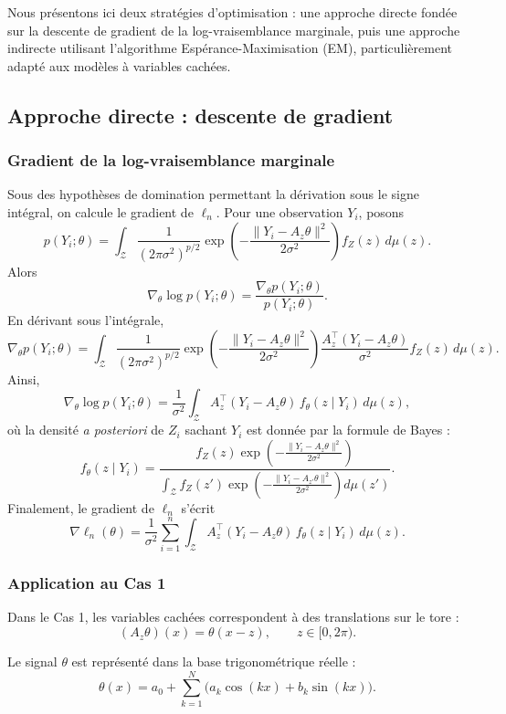 \documentclass[12pt, a4paper]{article}
\theoremstyle{definition}
\begin{document}
Nous présentons ici deux stratégies d’optimisation : une approche directe fondée sur la descente de gradient de la log-vraisemblance marginale, puis une approche indirecte utilisant l’algorithme Espérance-Maximisation (EM), particulièrement adapté aux modèles à variables cachées.

\subsection{Approche directe : descente de gradient}
\label{subsec:gradient}

\subsubsection{Gradient de la log-vraisemblance marginale}

Sous des hypothèses de domination permettant la dérivation sous le signe intégral, on calcule le gradient de $\ell_n$. Pour une observation $Y_i$, posons
\[
p(Y_i;\theta) = \int_{\mathcal{Z}} \frac{1}{(2\pi\sigma^2)^{p/2}} \exp\!\left( -\frac{\|Y_i-A_z\theta\|^2}{2\sigma^2} \right) f_Z(z)\,d\mu(z).
\]
Alors
\[
\nabla_\theta \log p(Y_i;\theta) = \frac{\nabla_\theta p(Y_i;\theta)}{p(Y_i;\theta)}.
\]
En dérivant sous l’intégrale,
\[
\nabla_\theta p(Y_i;\theta) = \int_{\mathcal{Z}} \frac{1}{(2\pi\sigma^2)^{p/2}} \exp\!\left( -\frac{\|Y_i-A_z\theta\|^2}{2\sigma^2} \right) \frac{A_z^\top (Y_i-A_z\theta)}{\sigma^2} f_Z(z)\,d\mu(z).
\]
Ainsi,
\[
\nabla_\theta \log p(Y_i;\theta) = \frac{1}{\sigma^2} \int_{\mathcal{Z}} A_z^\top (Y_i-A_z\theta) \, f_\theta(z\mid Y_i)\,d\mu(z),
\]
où la densité \textit{a posteriori} de $Z_i$ sachant $Y_i$ est donnée par la formule de Bayes :
\[
f_\theta(z\mid Y_i) = \frac{ f_Z(z) \exp\!\left( -\frac{\|Y_i-A_z\theta\|^2}{2\sigma^2} \right) }{ \int_{\mathcal{Z}} f_Z(z') \exp\!\left( -\frac{\|Y_i-A_{z'}\theta\|^2}{2\sigma^2} \right) d\mu(z') }.
\]
Finalement, le gradient de $\ell_n$ s’écrit
\[
\boxed{ \nabla \ell_n(\theta) = \frac{1}{\sigma^2} \sum_{i=1}^n \int_{\mathcal{Z}} A_z^\top (Y_i-A_z\theta) \, f_\theta(z\mid Y_i)\,d\mu(z) }.
\]

\subsubsection{Application au Cas 1}

Dans le Cas 1, les variables cachées correspondent à des translations sur le tore :
\[
(A_z\theta)(x)=\theta(x-z),
\qquad z\in[0,2\pi).
\]

Le signal $\theta$ est représenté dans la base trigonométrique réelle :
\[
\theta(x)
=
a_0
+
\sum_{k=1}^N
\bigl(
a_k\cos(kx)+b_k\sin(kx)
\bigr).
\]
\end{document}
